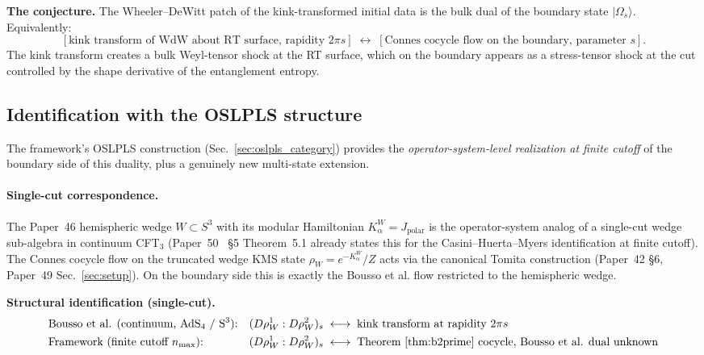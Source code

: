\documentclass[11pt,a4paper]{article}
\theoremstyle{plain}
\theoremstyle{definition}
\begin{document}
\textbf{The conjecture.} The Wheeler--DeWitt patch of the
kink-transformed initial data is the bulk dual of the boundary state
$|\Omega_{s}\rangle$. Equivalently:
\[
[\text{kink transform of WdW about RT surface, rapidity } 2\pi s]
\;\longleftrightarrow\;
[\text{Connes cocycle flow on the boundary, parameter } s].
\]
The kink transform creates a bulk Weyl-tensor shock at the RT surface,
which on the boundary appears as a stress-tensor shock at the cut
controlled by the shape derivative of the entanglement entropy.

\subsection{Identification with the OSLPLS structure}
\label{sec:oslpls_kink_identification}

The framework's OSLPLS construction (Sec.~\ref{sec:oslpls_category})
provides the \emph{operator-system-level realization at finite cutoff}
of the boundary side of this duality, plus a genuinely new
multi-state extension.

\paragraph{Single-cut correspondence.} The Paper~46 hemispheric
wedge $W \subset S^{3}$ with its modular Hamiltonian
$K_{\alpha}^{W} = J_{\mathrm{polar}}$ is the
operator-system analog of a single-cut wedge sub-algebra in continuum
CFT$_{3}$ (Paper~50~\cite{paper50} \S5 Theorem~5.1 already states this for the
Casini--Huerta--Myers identification at finite cutoff).
The Connes cocycle flow on the truncated wedge KMS state
$\rho_{W} = e^{-K_{\alpha}^{W}}/Z$ acts via the canonical Tomita
construction (Paper~42 \S6, Paper~49 Sec.~\ref{sec:setup}). On the
boundary side this is exactly the Bousso et al. flow restricted to the
hemispheric wedge.

\textbf{Structural identification (single-cut).}
\begin{equation}
\label{eq:single_cut_id}
\begin{aligned}
&\text{Bousso et al. (continuum, AdS$_{4}$ / S$^{3}$):} && (D \rho_{W}^{1} : D \rho_{W}^{2})_{s} \;\longleftrightarrow\; \text{kink transform at rapidity } 2\pi s\\
&\text{Framework (finite cutoff $n_{\max}$):} && (D \rho_{W}^{1} : D \rho_{W}^{2})_{s} \;\longleftrightarrow\; \text{Theorem~\ref{thm:b2prime} cocycle, Bousso et al. dual unknown}
\end{aligned}
\end{equation}
\end{document}
